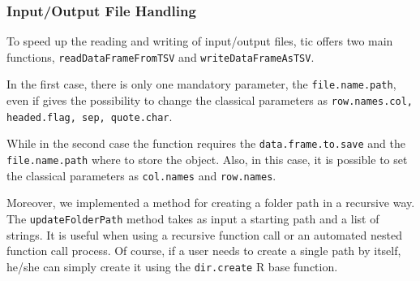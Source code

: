 \subsubsection{Input/Output File Handling}

To speed up the reading and writing of input/output files, \gls{tic} offers two main functions, \lstinline!readDataFrameFromTSV! and \lstinline!writeDataFrameAsTSV!.

In the first case, there is only one mandatory parameter, the \lstinline!file.name.path!, even if gives the possibility to change the classical parameters as \lstinline!row.names.col, headed.flag, sep, quote.char!.

While in the second case the function requires the \lstinline!data.frame.to.save! and the \lstinline!file.name.path! where to store the object. 
Also, in this case, it is possible to set the classical parameters as \lstinline!col.names! and \lstinline!row.names!.

Moreover, we implemented a method for creating a folder path in a recursive way.
The \lstinline!updateFolderPath! method takes as input a starting path and a list of strings. 
It is useful when using a recursive function call or an automated nested function call process.
Of course, if a user needs to create a single path by itself, he/she can simply create it using the \lstinline!dir.create! R base function.


















